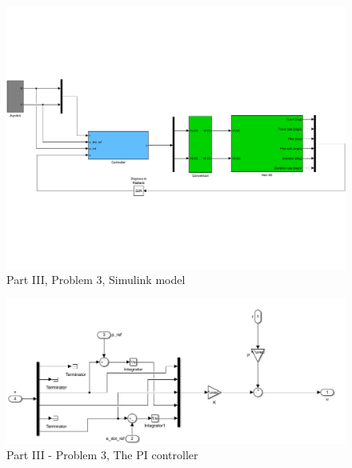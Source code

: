 \begin{figure}[htb]
	\centering
		\includegraphics[width=\textwidth]{models/P3p3.pdf}
	\caption{Part III, Problem 3, Simulink model}
\label{fig:P3p3}
\end{figure}

\begin{figure}[htb]
	\centering
		\includegraphics[width=\textwidth]{models/P3p3_PI_controller.PNG}
	\caption{Part III - Problem 3, The PI controller}
\label{fig:P3p3_PI}
\end{figure}

